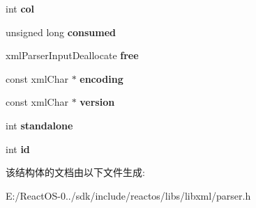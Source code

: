 \begin{DoxyCompactItemize}
int {\bfseries col}
\item 
\mbox{\label{struct__xml_parser_input_aa4dbae4bbb1c3ffa212ad5d41402e587}} 
unsigned long {\bfseries consumed}
\item 
\mbox{\label{struct__xml_parser_input_a7c55373e42c374bc9df1c542274398fa}} 
xml\+Parser\+Input\+Deallocate {\bfseries free}
\item 
\mbox{\label{struct__xml_parser_input_a5584d583c2961fad2f63fef889363cbf}} 
const xml\+Char $\ast$ {\bfseries encoding}
\item 
\mbox{\label{struct__xml_parser_input_ac15a9de83b0f6bee277164b50f0e2e41}} 
const xml\+Char $\ast$ {\bfseries version}
\item 
\mbox{\label{struct__xml_parser_input_a2799e20f843ea79b753d9f8b60d4b793}} 
int {\bfseries standalone}
\item 
\mbox{\label{struct__xml_parser_input_a20347691b442d481465e18f6777efecd}} 
int {\bfseries id}
\end{DoxyCompactItemize}


该结构体的文档由以下文件生成\+:\begin{DoxyCompactItemize}
\item 
E\+:/\+React\+O\+S-\/0../sdk/include/reactos/libs/libxml/parser.\+h\end{DoxyCompactItemize}
